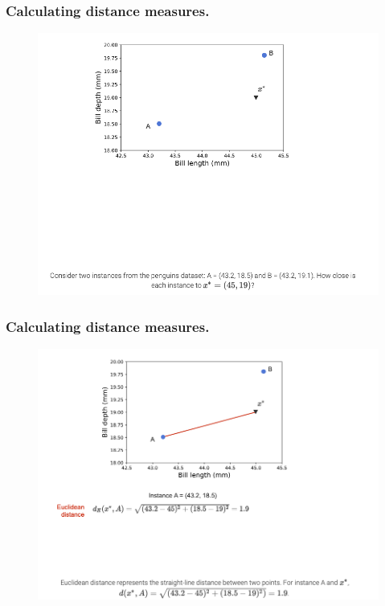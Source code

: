 \documentclass[8pt,dvipsnames]{beamer}
\begin{document}
\begin{frame}
	\frametitle{Calculating distance measures.}
	\begin{figure}[ht]
		\centering
		\includegraphics[width=0.7\linewidth]{imgs/knn_33.png}
	\end{figure}
\end{frame}

\begin{frame}
	\frametitle{Calculating distance measures.}
	\begin{figure}[ht]
		\centering
		\includegraphics[width=0.7\linewidth]{imgs/knn_34.png}
	\end{figure}
\end{frame}
\end{document}
